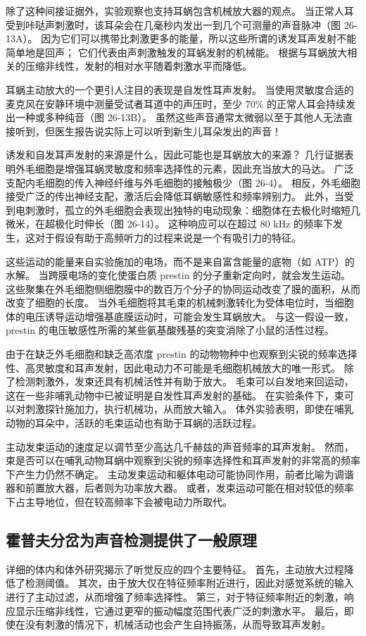 除了这种间接证据外，实验观察也支持耳蜗包含机械放大器的观点。 当正常人耳受到咔哒声刺激时，该耳朵会在几毫秒内发出一到几个可测量的声音脉冲（图 26-13A）。 因为它们可以携带比刺激更多的能量，所以这些所谓的诱发耳声发射不能简单地是回声； 它们代表由声刺激触发的耳蜗发射的机械能。 根据与耳蜗放大相关的压缩非线性，发射的相对水平随着刺激水平而降低。

耳蜗主动放大的一个更引人注目的表现是自发性耳声发射。 当使用灵敏度合适的麦克风在安静环境中测量受试者耳道中的声压时，至少 70\% 的正常人耳会持续发出一种或多种纯音（图 26-13B）。 虽然这些声音通常太微弱以至于其他人无法直接听到，但医生报告说实际上可以听到新生儿耳朵发出的声音！

诱发和自发耳声发射的来源是什么，因此可能也是耳蜗放大的来源？ 几行证据表明外毛细胞是增强耳蜗灵敏度和频率选择性的元素，因此充当放大的马达。 广泛支配内毛细胞的传入神经纤维与外毛细胞的接触极少（图 26-4）。 相反，外毛细胞接受广泛的传出神经支配，激活后会降低耳蜗敏感性和频率辨别力。 此外，当受到电刺激时，孤立的外毛细胞会表现出独特的电动现象：细胞体在去极化时缩短几微米，在超极化时伸长（图 26-14）。 这种响应可以在超过 80 kHz 的频率下发生，这对于假设有助于高频听力的过程来说是一个有吸引力的特征。

这些运动的能量来自实验施加的电场，而不是来自富含能量的底物（如 ATP）的水解。 当跨膜电场的变化使蛋白质 prestin 的分子重新定向时，就会发生运动。 这些聚集在外毛细胞侧细胞膜中的数百万个分子的协同运动改变了膜的面积，从而改变了细胞的长度。 当外毛细胞将其毛束的机械刺激转化为受体电位时，当细胞体的电压诱导运动增强基底膜运动时，可能会发生耳蜗放大。 与这一假设一致，prestin 的电压敏感性所需的某些氨基酸残基的突变消除了小鼠的活性过程。

由于在缺乏外毛细胞和缺乏高浓度 prestin 的动物物种中也观察到尖锐的频率选择性、高灵敏度和耳声发射，因此电动力不可能是毛细胞机械放大的唯一形式。 除了检测刺激外，发束还具有机械活性并有助于放大。 毛束可以自发地来回运动，这在一些非哺乳动物中已被证明是自发性耳声发射的基础。 在实验条件下，束可以对刺激探针施加力，执行机械功，从而放大输入。 体外实验表明，即使在哺乳动物的耳朵中，活跃的毛束运动也有助于耳蜗的活跃过程。

主动发束运动的速度足以调节至少高达几千赫兹的声音频率的耳声发射。 然而，束是否可以在哺乳动物耳蜗中观察到尖锐的频率选择性和耳声发射的非常高的频率下产生力仍然不确定。 主动发束运动和躯体电动可能协同作用，前者比喻为调谐器和前置放大器，后者则为功率放大器。 或者，发束运动可能在相对较低的频率下占主导地位，但在较高频率下会被电动力所取代。


\subsection{霍普夫分岔为声音检测提供了一般原理}
详细的体内和体外研究揭示了听觉反应的四个主要特征。 首先，主动放大过程降低了检测阈值。 其次，由于放大仅在特征频率附近进行，因此对感觉系统的输入进行了主动过滤，从而增强了频率选择性。 第三，对于特征频率附近的刺激，响应显示压缩非线性，它通过更窄的振动幅度范围代表广泛的刺激水平。 最后，即使在没有刺激的情况下，机械活动也会产生自持振荡，从而导致耳声发射。

